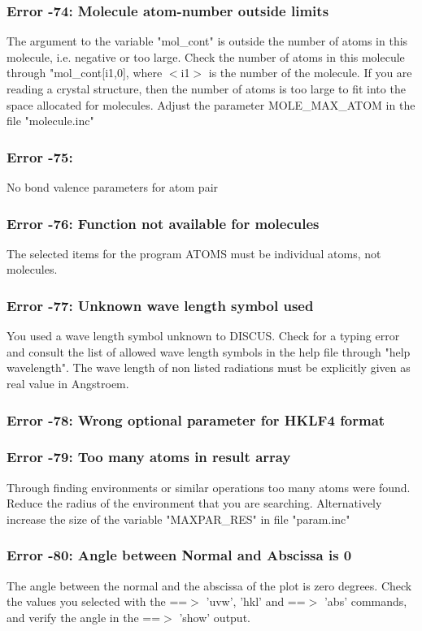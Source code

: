 \subsubsection{Error -74: Molecule atom-number outside limits}
\par
The argument to the variable "mol\_cont" is outside the number of 
atoms in this molecule, i.e. negative or too large. 
Check the number of atoms in this molecule through "mol\_cont[i1,0], 
where $ <$i1$> $ is the number of the molecule. 
If you are reading a crystal structure, then the number of atoms is 
too large to fit into the space allocated for molecules. Adjust the 
parameter MOLE\_MAX\_ATOM in the file "molecule.inc" 
\subsubsection{Error -75: }
No bond valence parameters for atom pair 
\subsubsection{Error -76: Function not available for molecules}
\par
The selected items for the program ATOMS must be individual atoms, 
not molecules. 
\subsubsection{Error -77: Unknown wave length symbol used}
\par
You used a wave length symbol unknown to DISCUS. Check for a typing 
error and consult the list of allowed wave length symbols in the help 
file through "help wavelength". The wave length of non listed radiations 
must be explicitly given as real value in Angstroem. 
\subsubsection{Error -78: Wrong optional parameter for HKLF4 format}
\subsubsection{Error -79: Too many atoms in result array}
\par
Through finding environments or similar operations too many atoms 
were found. Reduce the radius of the environment that you are searching. 
Alternatively increase the size of the variable "MAXPAR\_RES" in file 
"param.inc" 
\subsubsection{Error -80: Angle between Normal and Abscissa is 0}
\par
The angle between the normal and the abscissa of the plot is 
zero degrees. Check the values you selected with the ==$> $ 'uvw', 'hkl' 
and ==$> $ 'abs' commands, and verify the angle in the ==$> $ 'show' 
output. 
